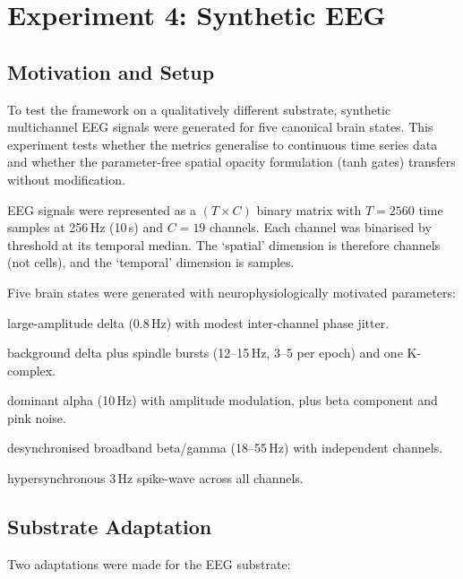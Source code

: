 \documentclass[12pt,a4paper]{article}
\begin{document}
\section{Experiment 4: Synthetic EEG}

\subsection{Motivation and Setup}

To test the framework on a qualitatively different substrate,
synthetic multichannel EEG signals were generated for five canonical
brain states.
This experiment tests whether the metrics generalise to continuous
time series data and whether the parameter-free spatial opacity
formulation (tanh gates) transfers without modification.

EEG signals were represented as a $(T\times C)$ binary matrix with
$T=2560$ time samples at 256\,Hz (10\,s) and $C=19$ channels.
Each channel was binarised by threshold at its temporal median.
The `spatial' dimension is therefore channels (not cells), and the
`temporal' dimension is samples.

Five brain states were generated with neurophysiologically motivated
parameters:

\begin{description}[noitemsep]
  \item[Deep sleep:] large-amplitude delta (0.8\,Hz) with modest
    inter-channel phase jitter.
  \item[NREM Stage~2 (sleep spindles):] background delta plus spindle
    bursts (12--15\,Hz, 3--5 per epoch) and one K-complex.
  \item[Awake, eyes-closed resting:] dominant alpha (10\,Hz) with
    amplitude modulation, plus beta component and pink noise.
  \item[Active cognitive task:] desynchronised broadband beta/gamma
    (18--55\,Hz) with independent channels.
  \item[Seizure (tonic-clonic):] hypersynchronous 3\,Hz spike-wave
    across all channels.
\end{description}

\subsection{Substrate Adaptation}

Two adaptations were made for the EEG substrate:
\end{document}
